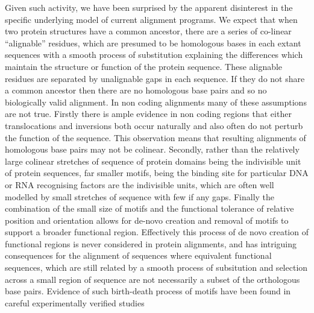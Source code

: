 \documentclass{article} \usepackage{a4}
\begin{document}
Given such activity, we have been surprised by the apparent
disinterest in the specific underlying model of current alignment
programs. We expect that when two protein structures have a common
ancestor, there are a series of co-linear ``alignable'' residues,
which are presumed to be homologous bases in each extant sequences
with a smooth process of substitution explaining the differences which
maintain the structure or function of the protein sequence. These
alignable residues are separated by unalignable gaps in each
sequence. If they do not share a common ancestor then there are no
homologous base pairs and so no biologically valid alignment. In non
coding alignments many of these assumptions are not true. Firstly
there is ample evidence in non coding regions that either
translocations and inversions both occur naturally and also often do
not perturb the function of the sequence.  This observation means that
resulting alignments of homologous base pairs may not be
colinear. Secondly, rather than the relatively large colinear
stretches of sequence of protein domains being the indivisible unit of
protein sequences, far smaller motifs, being the binding site for
particular DNA or RNA recognising factors are the indivisible units,
which are often well modelled by small stretches of sequence with few
if any gaps. Finally the combination of the small size of motifs and
the functional tolerance of relative position and orientation allows
for de-novo creation and removal of motifs to support a broader
functional region. Effectively this process of de novo creation of
functional regions is never considered in protein alignments, and has
intriguing consequences for the alignment of sequences where
equivalent functional sequences, which are still related by a smooth
process of subsitution and selection across a small region of sequence
are not necessarily a subset of the orthologous base pairs. Evidence
of such birth-death process of motifs have been found in careful
experimentally verified studies 
\end{document}
